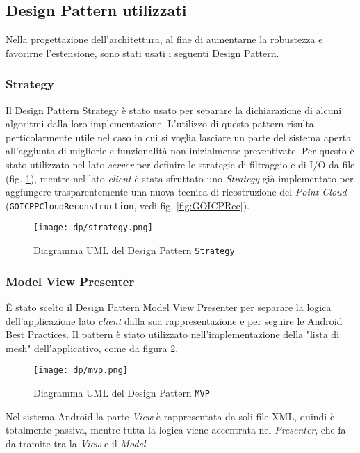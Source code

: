 \subsection{Design Pattern utilizzati}
Nella progettazione dell'architettura, al fine di aumentarne la robustezza e favorirne l'estensione, sono stati usati i seguenti \gls{Design Pattern}.

\subsubsection{Strategy}
Il Design Pattern Strategy è stato usato per separare la dichiarazione di alcuni algoritmi
dalla loro implementazione. L'utilizzo di questo pattern risulta perticolarmente utile nel caso in cui si voglia lasciare un parte del sistema aperta all'aggiunta di migliorie e funzionalità non inizialmente preventivate. Per questo è stato utilizzato nel lato \emph{server} per definire le strategie di filtraggio e di I/O da file (fig. \ref{fig:strategy}), mentre nel lato \emph{client} è stata sfruttato uno \emph{Strategy} già implementato per aggiungere trasparentemente una nuova tecnica di ricostruzione del \emph{Point Cloud} (\texttt{GOICPPCloudReconstruction}, vedi fig. \ref{fig:GOICPRec}).
\begin{figure}[!h] 
    \centering 
    \texttt{[image: dp/strategy.png]} 
    \caption{Diagramma UML del Design Pattern \texttt{Strategy}}
   \label{fig:strategy}
\end{figure}

\subsubsection{Model View Presenter}
È stato scelto il Design Pattern Model View Presenter per separare la logica dell’applicazione lato \emph{client} dalla sua rappresentazione e per seguire le Android Best Practices. Il pattern è stato utilizzato nell'implementazione della "lista di mesh" dell'applicativo, come da figura \ref{fig:mvp}.
\begin{figure}[!h] 
    \centering 
    \texttt{[image: dp/mvp.png]} 
    \caption{Diagramma UML del Design Pattern \texttt{MVP}}
   \label{fig:mvp}
\end{figure}
\newline
Nel sistema Android la parte \emph{View} è rappresentata da soli file XML, quindi è totalmente passiva, mentre tutta la logica viene accentrata nel \emph{Presenter}, che fa da tramite tra la  \emph{View} e il \emph{Model}.

